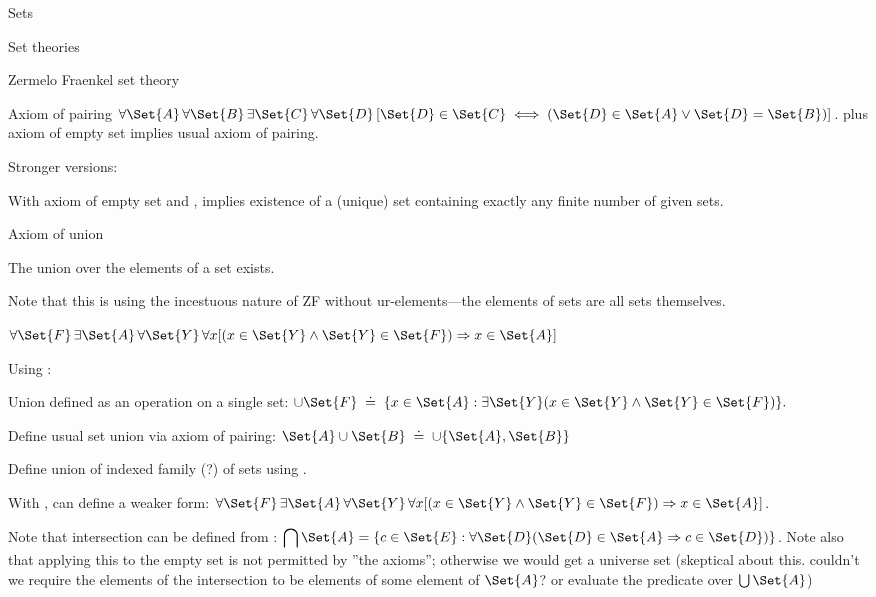 \begin{plSection}{Sets}
\begin{plSection}{Set theories}
\begin{plSection}{Zermelo Fraenkel set theory}
\begin{plSection}{Axiom of pairing}
${\displaystyle 
\forall \Set{A}\,\forall \Set{B}\,
\exists \Set{C}\,
\forall \Set{D}\,[\Set{D}\in \Set{C}
\iff (\Set{D}\in \Set{A}\lor \Set{D}=\Set{B})]}$.
plus 
axiom of empty set
implies usual axiom of pairing.

Stronger versions:

With axiom of empty set\cite{wiki:AxiomOfEmptySet} 
and ,
implies existence of a (unique) set containing exactly
any finite number of given sets.

\end{plSection}%
\begin{plSection}{Axiom of union}
\label{sec:Axiom-of-union}

The union over the elements of a set 
exists\cite{wiki:AxiomOfUnion}.

Note that this is using the incestuous nature of 
\textsf{ZF} without ur-elements---the elements of sets
are all sets themselves. 
 
$\forall {\Set{F}}\,
\exists \Set{A}\,
\forall \Set{Y}\,\forall x
[(x\in \Set{Y} \land \Set{Y}\in \Set{F})
\Rightarrow x\in \Set{A}]$

Using :

Union defined as an operation on a single set:\hfill\break
${\displaystyle 
\cup {\Set{F}} \; \doteq \;
\{x\in \Set{A}:\exists \Set{Y} 
(x \in \Set{Y} \land \Set{Y} \in \Set{F})\}.}$

Define usual set union via axiom of pairing:
$\Set{A} \cup \Set{B} \; \doteq \; \cup \{ \Set{A}, \Set{B}\}$

Define union of indexed family (?) of sets
using .

With ,
can define a weaker form:
$\forall {\Set{F}}\,\exists \Set{A}\,\forall \Set{Y}\,
\forall x
[(x\in \Set{Y} 
\land 
\Set{Y}\in {\Set{F}})
\Rightarrow 
x\in \Set{A}]$.

Note that intersection can be defined from 
:\hfill\linebreak
${\displaystyle 
\bigcap \Set{A}=\{c\in \Set{E}:
\forall \Set{D} (\Set{D} \in \Set{A} \Rightarrow c\in \Set{D})\}}$.
Note also that applying this to the empty set
is not permitted by ''the axioms'';
otherwise we would get a universe set 
(skeptical about this.
couldn't we require the elements of the intersection
to be elements of some element of $\Set{A}$?
or evaluate the predicate over $\bigcup \Set{A}$)


\end{plSection}
\end{plSection}
\end{plSection}
\end{plSection}
